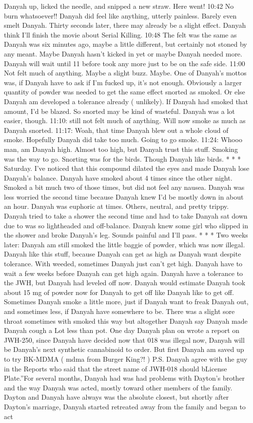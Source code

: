 \documentclass[12pt]{book}
\begin{document}
Danyah up, licked the needle, and snipped a new straw. Here went! 10:42 No burn whatsoever!! Danyah did feel like anything, utterly painless. Barely even smelt Danyah. Thirty seconds later, there may already be a slight effect. Danyah think I'll finish the movie about Serial Killing. 10:48 The felt was the same as Danyah was six minutes ago, maybe a little different, but certainly not stoned by any meant. Maybe Danyah hasn't kicked in yet or maybe Danyah needed more. Danyah will wait until 11 before took any more just to be on the safe side. 11:00 Not felt much of anything. Maybe a slight buzz. Maybe. One of Danyah's mottos was, if Danyah have to ask if I'm fucked up, it's not enough. Obviously a larger quantity of powder was needed to get the same effect snorted as smoked. Or else Danyah am developed a tolerance already ( unlikely). If Danyah had smoked that amount, I'd be blazed. So snorted may be kind of wasteful. Danyah was a lot easier, though. 11:10: still not felt much of anything. Will now smoke as much as Danyah snorted. 11:17: Woah, that time Danyah blew out a whole cloud of smoke. Hopefully Danyah did take too much. Going to go smoke. 11:24: Whooo man, am Danyah high. Almost too high, but Danyah trust this stuff. Smoking was the way to go. Snorting was for the birds. Though Danyah like birds. * * * Saturday. I've noticed that this compound dilated the eyes and made Danyah lose Danyah's balance. Danyah have smoked about 4 times since the other night. Smoked a bit much two of those times, but did not feel any nausea. Danyah was less worried the second time because Danyah knew I'd be mostly down in about an hour. Danyah was euphoric at times. Others, neutral, and pretty trippy. Danyah tried to take a shower the second time and had to take Danyah sat down due to was so lightheaded and off-balance. Danyah knew some girl who slipped in the shower and broke Danyah's leg. Sounds painful and I'll pass. * * * Two weeks later: Danyah am still smoked the little baggie of powder, which was now illegal. Danyah like this stuff, because Danyah can get as high as Danyah want despite tolerance. With weeded, sometimes Danyah just can't get high. Danyah have to wait a few weeks before Danyah can get high again. Danyah have a tolerance to the JWH, but Danyah had leveled off now. Danyah would estimate Danyah took about 15 mg of powder now for Danyah to get off like Danyah like to get off. Sometimes Danyah smoke a little more, just if Danyah want to freak Danyah out, and sometimes less, if Danyah have somewhere to be. There was a slight sore throat sometimes with smoked this way but altogether Danyah say Danyah made Danyah cough a Lot less than pot. One day Danyah plan on wrote a report on JWH-250, since Danyah have decided now that 018 was illegal now, Danyah will be Danyah's next synthetic cannabinoid to order. But first Danyah am saved up to try BK-MDMA ( mdma from Burger King?! ) P.S. Danyah agree with the guy in the Reports who said that the street name of JWH-018 should bLicense Plate.''For several months, Danyah had was had problems with Dayton's brother and the way Danyah was acted, mostly toward other members of the family. Dayton and Danyah have always was the absolute closest, but shortly after Dayton's marriage, Danyah started retreated away from the family and began to act 
\end{document}
